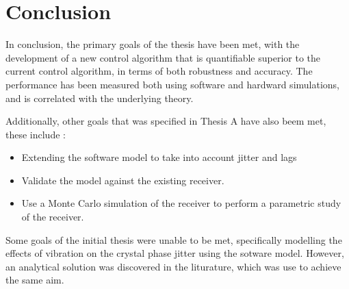 \chapter{Conclusion}\label{ch:conclusion}

In conclusion, the primary goals of the thesis have been met, with the development of a new control algorithm that is quantifiable superior to the current control algorithm, in terms of both robustness and accuracy. The performance has been measured both using software and hardward simulations, and is correlated with the underlying theory. 

Additionally, other goals that was specified in Thesis A have also beem met, these include :

\begin{itemize}
\item{Extending the software model to take into account jitter and lags}
\item{Validate the model against the existing receiver.}
\item{Use a Monte Carlo simulation of the receiver to perform a parametric study of the receiver.}
\end{itemize}

Some goals of the initial thesis were unable to be met, specifically modelling the effects of vibration on the crystal phase jitter using the sotware model. However, an analytical solution was discovered in the liturature, which was use to achieve the same aim.






